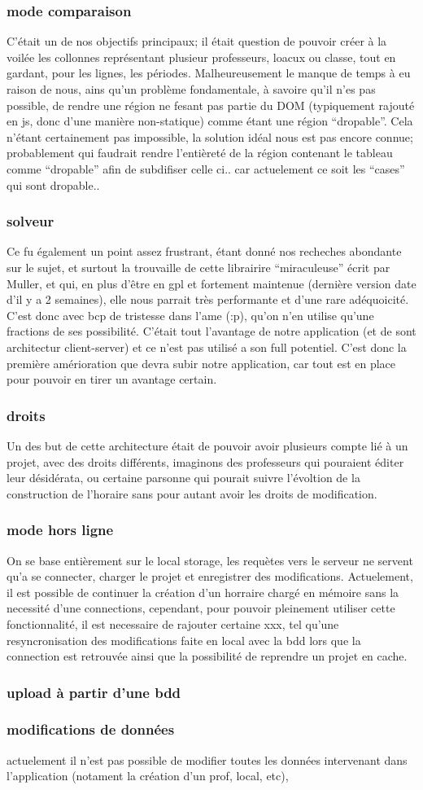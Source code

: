 \subsubsection{mode comparaison}
C'était un de nos objectifs principaux; il était question de pouvoir créer à la
voilée les collonnes représentant plusieur professeurs, loacux ou classe, tout
en gardant, pour les lignes, les périodes. Malheureusement le manque de temps à
eu raison de nous, ains qu'un problème fondamentale, à savoire qu'il n'es pas
possible, de rendre une région ne fesant pas partie du DOM (typiquement rajouté
en js, donc d'une manière non-statique) comme étant une région ``dropable''.
Cela n'étant certainement pas impossible, la solution idéal nous est pas encore
connue; probablement qui faudrait rendre l'entièreté de la région contenant le
tableau comme ``dropable'' afin de subdifiser celle ci.. car actuelement ce soit
les ``cases'' qui sont dropable..
\subsubsection{solveur}
Ce fu également un point assez frustrant, étant donné nos recheches abondante
sur le sujet, et surtout la trouvaille de cette librairire ``miraculeuse'' écrit
par Muller, et qui, en plus d'être en gpl et fortement maintenue (dernière
version date d'il y a 2 semaines), elle nous parrait très performante et d'une
rare adéquoicité.  C'est donc avec bcp de tristesse dans l'ame (:p), qu'on n'en
utilise qu'une fractions de ses possibilité.  C'était tout l'avantage de notre
application (et de sont architectur client-server) et ce n'est pas utilisé a son
full potentiel.  C'est donc la première amérioration que devra subir notre
application, car tout est en place pour pouvoir en tirer un avantage certain.
\subsubsection{droits}
Un des but de cette architecture était de pouvoir avoir plusieurs compte lié à
un projet, avec des droits différents, imaginons des professeurs qui pouraient
éditer leur désidérata, ou certaine parsonne qui pourait suivre l'évoltion de la
construction de l'horaire sans pour autant avoir les droits de modification.
\subsubsection{mode hors ligne}
On se base entièrement sur le local storage, les requètes vers le serveur ne
servent qu'a se connecter, charger le projet et enregistrer des modifications.
Actuelement, il est possible de continuer la création d'un horraire chargé en
mémoire sans la necessité d'une connections, cependant, pour pouvoir pleinement
utiliser cette fonctionnalité, il est necessaire de rajouter certaine xxx, tel
qu'une resyncronisation des modifications faite en local avec la bdd lors que la
connection est retrouvée ainsi que la possibilité de reprendre un projet en
cache.
\subsubsection{upload à partir d'une bdd}
\subsubsection{modifications de données}
actuelement il n'est pas possible de modifier toutes les données intervenant
dans l'application (notament la création d'un prof, local, etc), 
